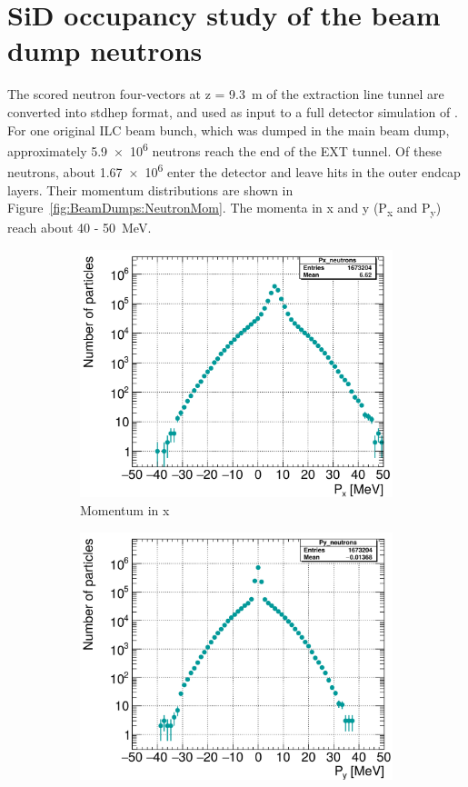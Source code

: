 \section{SiD occupancy study of the beam dump neutrons}
\label{BeamDumps:SiDocc}
The scored neutron four-vectors at z = \SI{9.3}{\meter} of the extraction line tunnel are converted into stdhep format, and used as input to a full detector simulation of \sid.
For one original ILC beam bunch, which was dumped in the main beam dump, approximately \num{5.9e6} neutrons reach the end of the EXT tunnel.
Of these neutrons, about \num{1.67e6} enter the \sid detector and leave hits in the outer endcap layers.
Their momentum distributions are shown in Figure~\ref{fig:BeamDumps:NeutronMom}.
The momenta in x and y (P\textsubscript{x} and P\textsubscript{y}) reach about 40 - \SI{50}{\MeV}.
\begin{figure}[!b]
 \centering
  \begin{subfigure}[b]{0.32\textwidth}
   \centering
    \includegraphics[width=\textwidth]{Figures/BeamDump/neutrons_Px.png}
   \caption{Momentum in x}
   \end{subfigure}
   \hfill
   \begin{subfigure}[b]{0.32\textwidth}
   \centering
    \includegraphics[width=\textwidth]{Figures/BeamDump/neutrons_Py.png}

\end{subfigure}
\end{figure}
